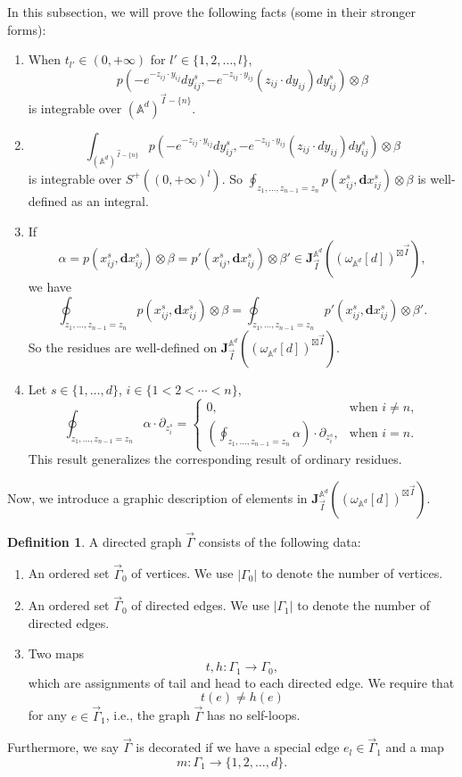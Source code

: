 \documentclass[11pt]{amsart}
\theoremstyle{definition}
\newtheorem{defn}[thm]{Definition}
\theoremstyle{remark}
\numberwithin{equation}{section}
\begin{document}
In this subsection, we will prove the following facts (some in their stronger forms):
\begin{enumerate}
    \item When $t_{l'}\in(0,+\infty)$ for $l'\in\{1,2,\dots,l\}$,
    $$
    p(-e^{-z_{ij}\cdot y_{ij}}dy_{ij}^{s},-e^{-z_{ij}\cdot y_{ij}}(z_{ij}\cdot dy_{ij})dy_{ij}^{s})\otimes \beta
    $$
    is integrable over $(\mathbb{A}^{d})^{\vec{I}-\{n\}}$.
    \item 
    $$\int_{(\mathbb{A}^{d})^{\vec{I}-\{n\}}}p(-e^{-z_{ij}\cdot y_{ij}}dy_{ij}^{s},-e^{-z_{ij}\cdot y_{ij}}(z_{ij}\cdot dy_{ij})dy_{ij}^{s})\otimes \beta
    $$
    is integrable over $S^{+}((0,+\infty)^l)$. So $\oint_{z_1,\dots,z_{n-1}=z_n}p(x_{ij}^{s},\mathbf{d}x_{ij}^{s})\otimes \beta$ is well-defined as an integral.
    \item If 
    $$
    \alpha=p(x_{ij}^{s},\mathbf{d}x_{ij}^{s})\otimes \beta=p'(x_{ij}^{s},\mathbf{d}x_{ij}^{s})\otimes \beta'\in \mathbf{J}_{\vec{I}}^{\mathbb{A}^{d}}((\omega_{\mathbb{A}^{d}}[d])^{\boxtimes\vec{I}}),
    $$
    we have
    $$
    \oint_{z_1,\dots,z_{n-1}=z_n}p(x_{ij}^{s},\mathbf{d}x_{ij}^{s})\otimes \beta=\oint_{z_1,\dots,z_{n-1}=z_n}p'(x_{ij}^{s},\mathbf{d}x_{ij}^{s})\otimes \beta'.
    $$
    So the residues are well-defined on $\mathbf{J}_{\vec{I}}^{\mathbb{A}^{d}}((\omega_{\mathbb{A}^{d}}[d])^{\boxtimes\vec{I}})$.
    \item Let $s\in\{1,\dots,d\}$, $i\in\{1<2<\cdots<n\}$,
    $$
    \oint_{z_1,\dots,z_{n-1}=z_n}\alpha\cdot \partial_{z_{i}^{s}}=
    \begin{cases}
        0, &\text{when  }i\neq n,\\
    \left(\oint_{z_1,\dots,z_{n-1}=z_n}\alpha\right)\cdot \partial_{z_{i}^{s}}, &\text{when  }i=n.
    \end{cases}
    $$
    This result generalizes the corresponding result of ordinary residues.
\end{enumerate}

Now, we introduce a graphic description of elements in $\mathbf{J}_{\vec{I}}^{\mathbb{A}^{d}}((\omega_{\mathbb{A}^{d}}[d])^{\boxtimes\vec{I}})$.
\begin{defn}
    A directed graph $\vec{\Gamma}$ consists of the following data:
    \begin{enumerate}
        \item An ordered set $\vec{\Gamma}_{0}$ of vertices. We use $|\Gamma_{0}|$ to denote the number of vertices.
        \item An ordered set $\vec{\Gamma}_{0}$ of directed edges. We use $|\Gamma_{1}|$ to denote the number of directed edges.
        \item Two maps
        $$
        t,h:\Gamma_{1}\rightarrow\Gamma_{0},
        $$
        which are assignments of tail and head to each directed edge. We require that 
        $$
        t(e)\neq h(e)
        $$
        for any $e\in\vec{\Gamma}_{1}$, i.e., the graph $\vec{\Gamma}$ has no self-loops.
    \end{enumerate}
    Furthermore, we say $\vec{\Gamma}$ is decorated if we have a special edge $e_{l}\in \vec{\Gamma}_{1}$ and a map 
    $$
    m:\Gamma_{1}\rightarrow\{1,2,\dots,d\}.
    $$
\end{defn}
\end{document}
